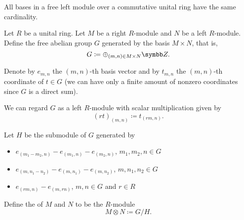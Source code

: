 \begin{proposition}\label{thm:left_module_basis_cardinality}\cite{ProofWiki:bases_of_free_module_have_same_cardinality}
  All bases in a free left module over a commutative unital ring have the same cardinality.
\end{proposition}

\begin{definition}\label{def:module_tensor_product}\cite[574]{Knapp2016BAlg}
  Let \( R \) be a unital ring. Let \( M \) be a right \( R \)-module and \( N \) be a left \( R \)-module. Define the free abelian group \( G \) generated by the basis \( M \times N \), that is,
  \begin{equation*}
    G \coloneqq \oplus_{(m,n) \in M \times N} \Z.
  \end{equation*}

  Denote by \( e_{m,n} \) the \( (m,n) \)-th basis vector and by \( t_{m,n} \) the \( (m,n) \)-th coordinate of \( t \in G \) (we can have only a finite amount of nonzero coordinates since \( G \) is a direct sum).

  We can regard \( G \) as a left \( R \)-module with scalar multiplication given by
  \begin{equation*}
    (r t)_{(m,n)} \coloneqq t_{(rm,n)}.
  \end{equation*}

  Let \( H \) be the submodule of \( G \) generated by
  \begin{itemize}
    \item \( e_{(m_1 - m_2, n)} - e_{(m_1,n)} - e_{(m_2,n)} \), \( m_1, m_2, n \in G \)
    \item \( e_{(m, n_1 - n_2)} - e_{(m,n_1)} - e_{(m,n_2)} \), \( m, n_1, n_2 \in G \)
    \item \( e_{(rm,n)} - e_{(m,rn)} \), \( m, n \in G \) and \( r \in R \)
  \end{itemize}

  Define the  of \( M \) and \( N \) to be the \( R \)-module 
  \begin{equation*}
    M \otimes N \coloneqq G / H.
  \end{equation*}
\end{definition}

